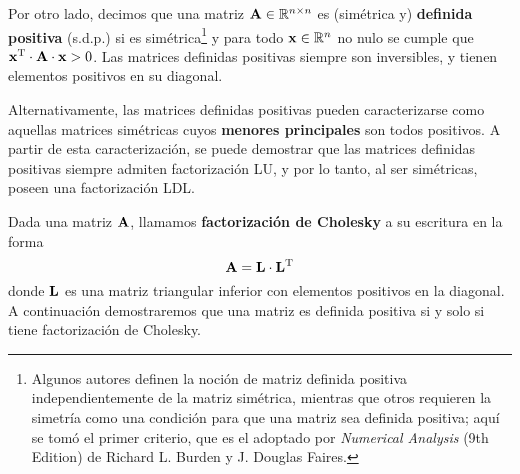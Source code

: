 Por otro lado, decimos que una matriz $\mathbf{A} \in \mathbb{R}^{n \times n}$
es (simétrica y) \textbf{definida positiva} (s.d.p.) si es
simétrica\footnote{Algunos autores definen la noción de matriz definida
positiva independientemente de la matriz simétrica, mientras que otros
requieren la simetría como una condición para que una matriz sea definida
positiva; aquí se tomó el primer criterio, que es el adoptado por
\emph{Numerical Analysis} (9th Edition) de Richard L. Burden y J. Douglas
Faires.}
y para todo $\mathbf{x} \in \mathbb{R}^{n}$ no nulo se cumple que
$\mathbf{x}^{\mathrm{T}} \cdot \mathbf{A} \cdot \mathbf{x} > 0$. Las matrices definidas positivas siempre son inversibles, y tienen elementos positivos en su diagonal.

Alternativamente, las matrices definidas positivas pueden caracterizarse como
aquellas matrices simétricas cuyos \textbf{menores
principales} son todos positivos. 
A partir de esta caracterización, se puede demostrar que las matrices
definidas positivas siempre admiten factorización LU, y por lo tanto,
al ser simétricas, poseen una factorización LDL.

Dada una matriz $\mathbf{A}$, llamamos \textbf{factorización de Cholesky} a su
escritura en la forma
\[ \mathbf{A} = \mathbf{L} \cdot \mathbf{L}^{\mathrm{T}} \]
donde $\mathbf{L}$ es una matriz triangular inferior con elementos positivos
en la diagonal. A continuación demostraremos que una matriz es
definida positiva si y solo si tiene factorización de Cholesky.

